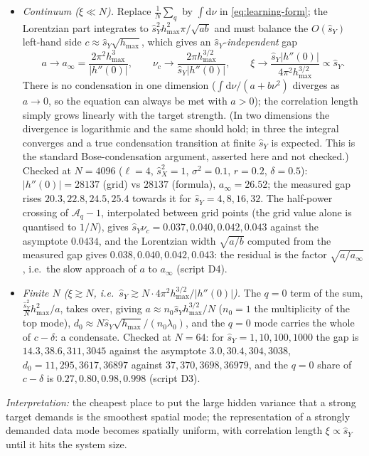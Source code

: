 \documentclass[11pt,a4paper]{article}
\newcommand{\sX}{\hat s_X^2}
\newcommand{\sY}{\hat s_Y^2}
\newcommand{\amp}{\mathcal A}
\theoremstyle{remark}
\begin{document}
\begin{itemize}[nosep]
  \item \emph{Continuum ($\xi\ll N$).} Replace $\frac1N\sum_q$ by $\int\mathrm d\nu$ in \eqref{eq:learning-form}; the Lorentzian part integrates to $\sY h_{\max}^2\pi/\sqrt{ab}$ and must balance the $O(\hat s_Y)$ left-hand side $c\approx\hat s_Y\sqrt{h_{\max}}$, which gives an $\hat s_Y$-\emph{independent} gap
  \begin{equation}
    a\to a_\infty = \frac{2\pi^2h_{\max}^3}{|h''(0)|},\qquad
    \nu_c\to\frac{2\pi h_{\max}^{3/2}}{\hat s_Y|h''(0)|},\qquad
    \xi\to\frac{\hat s_Y|h''(0)|}{4\pi^2h_{\max}^{3/2}}\propto\hat s_Y .
  \end{equation}
  There is no condensation in one dimension ($\int\mathrm d\nu/(a+b\nu^2)$ diverges as $a\to0$, so the equation can always be met with $a>0$); the correlation length simply grows linearly with the target strength. (In two dimensions the divergence is logarithmic and the same should hold; in three the integral converges and a true condensation transition at finite $\hat s_Y$ is expected. This is the standard Bose-condensation argument, asserted here and not checked.) Checked at $N = 4096$ ($\ell = 4$, $\sX = 1$, $\sigma^2 = 0.1$, $r = 0.2$, $\delta = 0.5$): $|h''(0)| = 28137$ (grid) vs $28137$ (formula), $a_\infty = 26.52$; the measured gap rises $20.3, 22.8, 24.5, 25.4$ towards it for $\hat s_Y = 4, 8, 16, 32$. The half-power crossing of $\amp_q - 1$, interpolated between grid points (the grid value alone is quantised to $1/N$), gives $\hat s_Y\nu_c = 0.037, 0.040, 0.042, 0.043$ against the asymptote $0.0434$, and the Lorentzian width $\sqrt{a/b}$ computed from the measured gap gives $0.038, 0.040, 0.042, 0.043$: the residual is the factor $\sqrt{a/a_\infty}$, i.e.\ the slow approach of $a$ to $a_\infty$ (script D4).
  \item \emph{Finite $N$ ($\xi\gtrsim N$, i.e.\ $\hat s_Y\gtrsim N\cdot4\pi^2h_{\max}^{3/2}/|h''(0)|$).} The $q = 0$ term of the sum, $\frac{\sY}{N}h_{\max}^2/a$, takes over, giving $a\approx n_0\hat s_Yh_{\max}^{3/2}/N$ ($n_0 = 1$ the multiplicity of the top mode), $d_0\approx N\hat s_Y\sqrt{h_{\max}}/(n_0\lambda_0)$, and the $q = 0$ mode carries the whole of $c-\delta$: a condensate. Checked at $N = 64$: for $\hat s_Y = 1, 10, 100, 1000$ the gap is $14.3, 38.6, 311, 3045$ against the asymptote $3.0, 30.4, 304, 3038$, $d_0 = 11, 295, 3617, 36897$ against $37, 370, 3698, 36979$, and the $q = 0$ share of $c-\delta$ is $0.27, 0.80, 0.98, 0.998$ (script D3).
\end{itemize}
\emph{Interpretation:} the cheapest place to put the large hidden variance that a strong target demands is the smoothest spatial mode; the representation of a strongly demanded data mode becomes spatially uniform, with correlation length $\xi\propto\hat s_Y$ until it hits the system size.
\end{document}
